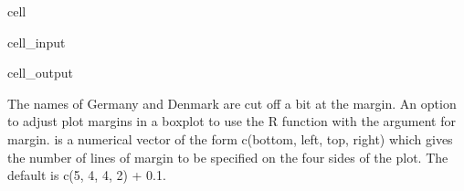 \documentclass[letterpaper,10pt,english]{jupyterBook}
\begin{document}
\begin{sphinxuseclass}{cell}\begin{sphinxVerbatimInput}

\begin{sphinxuseclass}{cell_input}
\begin{sphinxVerbatim}[commandchars=\\\{\}]
\end{sphinxVerbatim}

\end{sphinxuseclass}\end{sphinxVerbatimInput}
\begin{sphinxVerbatimOutput}

\begin{sphinxuseclass}{cell_output}
\noindent{}

\end{sphinxuseclass}\end{sphinxVerbatimOutput}

\end{sphinxuseclass}
\sphinxAtStartPar
The names of Germany and Denmark are cut off a bit at the margin. An option to adjust plot margins in a boxplot to use the R function  with the argument  for margin. is a numerical vector of the form c(bottom, left, top, right) which gives the number of lines of margin to be specified on the four sides of the plot. The default is c(5, 4, 4, 2) + 0.1.
\end{document}
